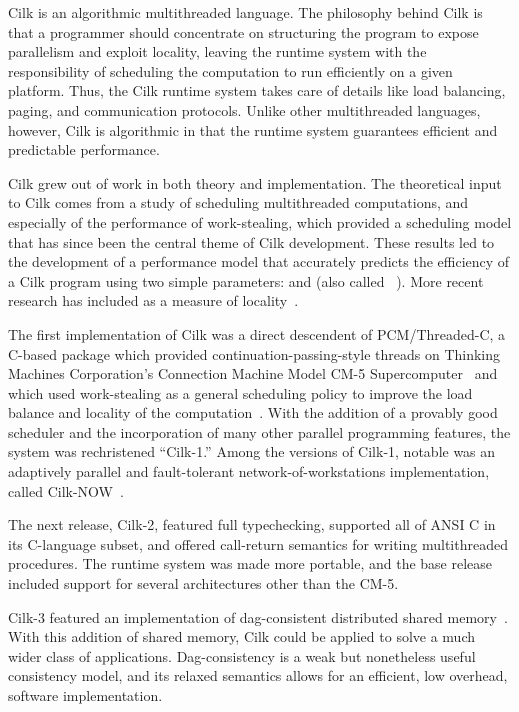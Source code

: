 Cilk is an algorithmic multithreaded language.  The philosophy behind
Cilk is that a programmer should concentrate on structuring the
program to expose parallelism and exploit locality, leaving the
runtime system with the responsibility of scheduling the computation
to run efficiently on a given platform.  Thus, the Cilk runtime system
takes care of details like load balancing, paging, and communication
protocols.  Unlike other multithreaded languages, however, Cilk is
algorithmic in that the runtime system guarantees efficient and
predictable performance.

Cilk grew out of work in both theory and implementation.  The
theoretical input to Cilk comes from a study of scheduling
multithreaded computations, and especially of the performance of
work-stealing, which provided a scheduling model that has since been
the central theme of Cilk development.  These results led to the
development of a performance model that accurately predicts the
efficiency of a Cilk program using two simple parameters:
 and 
(also called ~\cite{BlumofeJoKu95,
BlumofeLe94, Blumofe95}).  More recent
research has included  as a measure of locality~\cite{BlumofeFrJo96b, BlumofeFrJo96a,
Joerg96}.

The first implementation of Cilk was a direct descendent of
PCM/Threaded-C, a C-based package which provided
continuation-passing-style threads on Thinking Machines Corporation's
Connection Machine Model CM-5 Supercomputer~\cite{LeisersonAbDo92} and
which used work-stealing as a general scheduling policy to improve the
load balance and locality of the computation~\cite{HalbherrZhJo94}.
With the addition of a provably good scheduler and the incorporation
of many other parallel programming features, the system was
rechristened ``Cilk-1.''  Among the versions of Cilk-1, notable was an
adaptively parallel and fault-tolerant network-of-workstations
implementation, called Cilk-NOW~\cite{Blumofe95,BlumofePa94}.

The next release, Cilk-2, featured full typechecking, supported all of
ANSI C in its C-language subset, and offered call-return semantics for
writing multithreaded procedures.  The runtime system was made more
portable, and the base release included support for several
architectures other than the CM-5.

Cilk-3 featured an implementation of dag-consistent distributed shared
memory~\cite{BlumofeFrJo96a,Joerg96}.  With this addition of shared
memory, Cilk could be applied to solve a much wider class of
applications.  Dag-consistency is a weak but nonetheless useful
consistency model, and its relaxed semantics allows for an efficient,
low overhead, software implementation.

